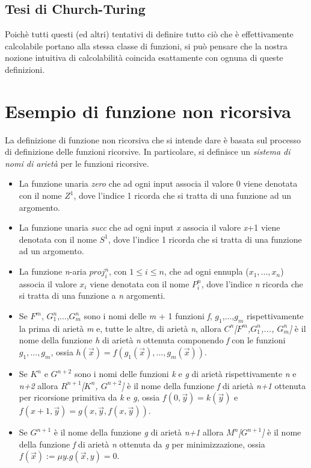 \subsection{Tesi di Church-Turing}
Poichè tutti questi (ed altri) tentativi di definire tutto ciò che è
effettivamente calcolabile portano alla stessa classe di funzioni, si
può pensare che la nostra nozione intuitiva di calcolabilità coincida
esattamente con ognuna di queste definizioni.



\section{Esempio di funzione non ricorsiva}
La definizione di funzione non ricorsiva che si intende dare è basata sul processo di definizione delle funzioni ricorsive. In particolare, si definisce un \emph{sistema di nomi di arietà} per le funzioni ricorsive.

\begin{itemize}
 \item La funzione unaria \emph{zero} che ad ogni input associa il valore 0 viene denotata con il nome \emph{$Z^1$}, dove l'indice 1 ricorda che si tratta di una funzione ad un argomento.
\item La funzione unaria \emph{succ} che ad ogni input \emph{x} associa il valore \emph{x}+1 viene denotata con il nome \emph{$S^1$}, dove l'indice 1 ricorda che si tratta di una funzione ad un argomento.
\item La funzione \emph{n}-aria \emph{$proj^n_i$}, con \emph{$1 \leq i\leq n$}, che ad ogni ennupla (\emph{$x_1,...,x_n$}) associa il valore \emph{$x_i$} viene denotata con il nome \emph{$P^n_i$}, dove l'indice \emph{n} ricorda che si tratta di una funzione a \emph{n} argomenti.
\item Se \emph{$F^m$},  \emph{$G^n_1$},...,\emph{$G^n_m$} sono i nomi delle \emph{m} + 1 funzioni \emph{f}, \emph{$g_1$},...,\emph{$g_m$} rispettivamente la prima di arietà \emph{m} e, tutte le altre, di arietà \emph{n}, allora \emph{$C^n$[$F^m$,$G^n_1$,..., $G^n_m$]} è il nome della funzione \emph{h} di arietà \emph{n} ottenuta componendo \emph{f} con le funzioni \emph{$g_1,...,g_m$}, ossia \emph{$h(\vec{x}) = f(g_1(\vec{x}),...,g_m(\vec{x}))$}.
\item Se \emph{$K^n$} e \emph{$G^{n+2}$} sono i nomi delle funzioni \emph{k} e \emph{g} di arietà rispettivamente \emph{n} e \emph{n+2} allora \emph{$R^{n+1}$[$K^n$, $G^{n+2}$]} è il nome della funzione \emph{f} di arietà \emph{n+1} ottenuta per ricorsione primitiva da \emph{k} e \emph{g}, ossia \emph{$f(0, \vec{y}) =k(\vec{y})$} e \emph{$f(x+1, \vec{y}) =g(x, \vec{y}, f(x, \vec{y}))$}.
\item Se \emph{$G^{n+1}$} è il nome della funzione \emph{g} di arietà \emph{n+1} allora \emph{$M^n$[$G^{n+1}$]} è il nome della funzione \emph{f} di arietà \emph{n} ottenuta da \emph{g} per minimizzazione, ossia \emph{$f(\vec{x}) := \mu y.g(\vec{x}, y) = 0$}.
\end{itemize}


